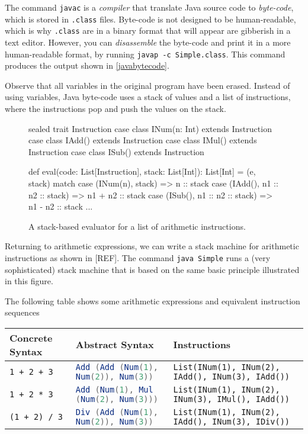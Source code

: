 \documentclass[9pt]{extbook}
\begin{document}
The command \verb|javac| is a \emph{compiler} that translate Java source code to
\emph{byte-code}, which is stored in \verb|.class| files. Byte-code is not designed
to be human-readable, which is why \verb|.class| are in a binary format that will appear
are gibberish in a text editor. However, you can \emph{disassemble} the byte-code
and print it in a more human-readable format, by running \verb|javap -c Simple.class|.
This command produces the output shown in \cref{javabytecode}.

Observe that all variables in the original program
have been erased. Instead of using variables, Java byte-code uses a stack of values
and a list of instructions, where the instructions pop and push the values on the stack.

\begin{figure}
\begin{scalacode}
sealed trait Instruction
case class INum(n: Int) extends Instruction
case class IAdd() extends Instruction
case class IMul() extends Instruction
case class ISub() extends Instruction

def eval(code: List[Instruction], stack: List[Int]): List[Int] = (e, stack) match {
  case (INum(n), stack) => n :: stack
  case (IAdd(), n1 :: n2 :: stack) => n1 + n2 :: stack
  case (ISub(), n1 :: n2 :: stack) => n1 - n2 :: stack
  ...
}
\end{scalacode}
\caption{A stack-based evaluator for a list of arithmetic instructions.}
\end{figure}

Returning to arithmetic expressions, we can write a stack machine for arithmetic
instructions as shown in
[REF]. The command \verb|java Simple| runs
a (very sophisticated) stack machine that is based on the same basic principle illustrated
in this figure.

The following table shows some arithmetic expressions and equivalent 
instruction sequences

\begin{tabular}{l|l|l}
Concrete Syntax & Abstract Syntax & Instructions \\
\hline
\verb|1 + 2 + 3| & \lstinline[language=scala]|Add (Add (Num(1), Num(2)), Num(3))|
& \lstinline|List(INum(1), INum(2), IAdd(), INum(3), IAdd())| \\
\verb|1 + 2 * 3| & \lstinline[language=scala]|Add (Num(1), Mul (Num(2), Num(3)))|
& \lstinline|List(INum(1), INum(2), INum(3), IMul(), IAdd())| \\
\verb|(1 + 2) / 3| & \lstinline[language=scala]|Div (Add (Num(1), Num(2)), Num(3))|
& \lstinline|List(INum(1), INum(2), IAdd(), INum(3), IDiv())|
\end{tabular}
\end{document}
